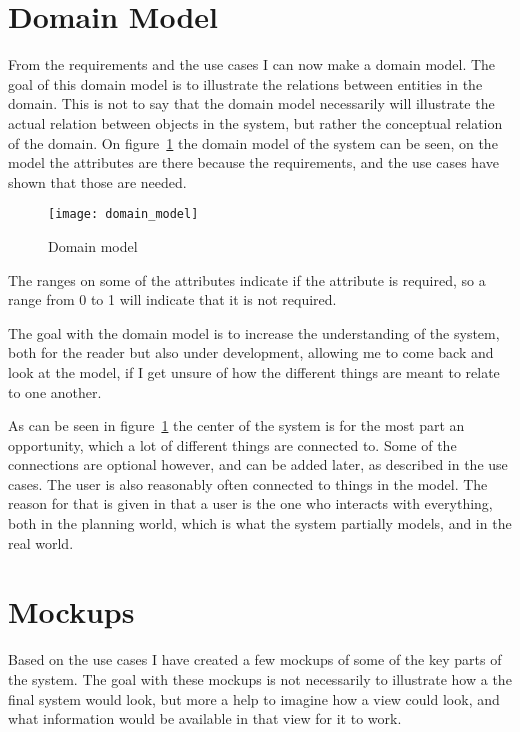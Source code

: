 \section{Domain Model}
\label{sec:Domain Model}

From the requirements and the use cases I can now make a domain model. The goal of this domain model is to illustrate the relations between entities in the domain\cite{larman}. This is not to say that the domain model necessarily will illustrate the actual relation between objects in the system, but rather the conceptual relation of the domain. On figure~\ref{fig:domain_model} the domain model of  the system can be seen, on the model the attributes are there because the requirements, and the use cases have shown that those are needed.

\begin{figure}[!htb]
  \centering
  \texttt{[image: domain\_model]}
  \caption{Domain model}
  \label{fig:domain_model}
\end{figure}

The ranges on some of the attributes indicate if the attribute is required, so a range from 0 to 1 will indicate that it is not required.

The goal with the domain model is to increase the understanding of the system, both for the reader but also under development, allowing me to come back and look at the model, if I get unsure of how the different things are meant to relate to one another.

As can be seen in figure~\ref{fig:domain_model} the center of the system is for the most part an opportunity, which a lot of different things are connected to. Some of the connections are optional however, and can be added later, as described in the use cases. The user is also reasonably often connected to things in the model. The reason for that is given in that a user is the one who interacts with everything, both in the planning world, which is what the system partially models, and in the real world.

\section{Mockups}
\label{sec:Mockups}
Based on the use cases I have created a few mockups of some of the key parts of
the system. The goal with these mockups is not necessarily to illustrate how a
the final system would look, but more a help to imagine how a view could look,
and what information would be available in that view for it to work.

